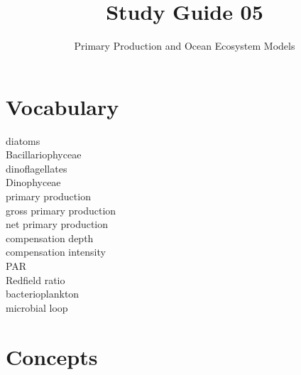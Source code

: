 \documentclass[nofonts, letterpaper]{tufte-handout}
\title{Study Guide 05}
\author{Primary Production and Ocean Ecosystem Models}
\date{} %
\begin{document}
\maketitle	%


\section{Vocabulary}
\vspace{-1\baselineskip}
\begin{multicols}{2}
diatoms \\
Bacillariophyceae \\
dinoflagellates \\
Dinophyceae \\
primary production \\
gross primary production \\
net primary production \\
compensation depth \\
compensation intensity \\
PAR \\
Redfield ratio\\
bacterioplankton \\
microbial loop
\end{multicols}

\section{Concepts}
\end{document}
